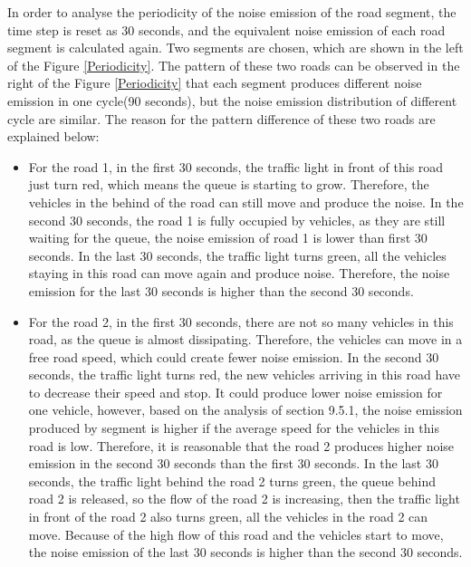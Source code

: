\documentclass{article}
\begin{document}
\noindent In order to analyse the periodicity of the noise emission of the road segment, the time step is reset as 30 seconds, and the equivalent noise emission of each road segment is calculated again. Two segments are chosen, which are shown in the left of the Figure \ref{Periodicity}. The pattern of these two roads can be observed in the right of the Figure \ref{Periodicity} that each segment produces different noise emission in one cycle(90 seconds), but the noise emission distribution of different cycle are similar. The reason for the pattern difference of these two roads are explained below:
{\color{red}
\begin{itemize}
    \item For the road 1, in the first 30 seconds, the traffic light in front of this road just turn red, which means the queue is starting to grow. Therefore, the vehicles in the behind of the road can still move and produce the noise. In the second 30 seconds, the road 1 is fully occupied by vehicles, as they are still waiting for the queue, the noise emission of road 1 is lower than first 30 seconds. In the last 30 seconds, the traffic light turns green, all the vehicles staying in this road can move again and produce noise. Therefore, the noise emission for the last 30 seconds is higher than the second 30 seconds.
    \item For the road 2, in the first 30 seconds, there are not so many vehicles in this road, as the queue is almost dissipating. Therefore, the vehicles can move in a free road speed, which could create fewer noise emission. In the second 30 seconds, the traffic light turns red, the new vehicles arriving in this road have to decrease their speed and stop. It could produce lower noise emission for one vehicle,  however, based on the analysis of section 9.5.1, the noise emission produced by segment is higher if the average speed for the vehicles in this road is low. Therefore, it is reasonable that the road 2 produces higher noise emission in the second 30 seconds than the first 30 seconds. In the last 30 seconds, the traffic light behind the road 2 turns green, the queue behind road 2 is released, so the flow of the road 2 is increasing, then the traffic light in front of the road 2 also turns green, all the vehicles in the road 2 can move. Because of the high flow of this road and the vehicles start to move, the noise emission of the last 30 seconds is higher than the second 30 seconds.
\end{itemize}
}
\end{document}
